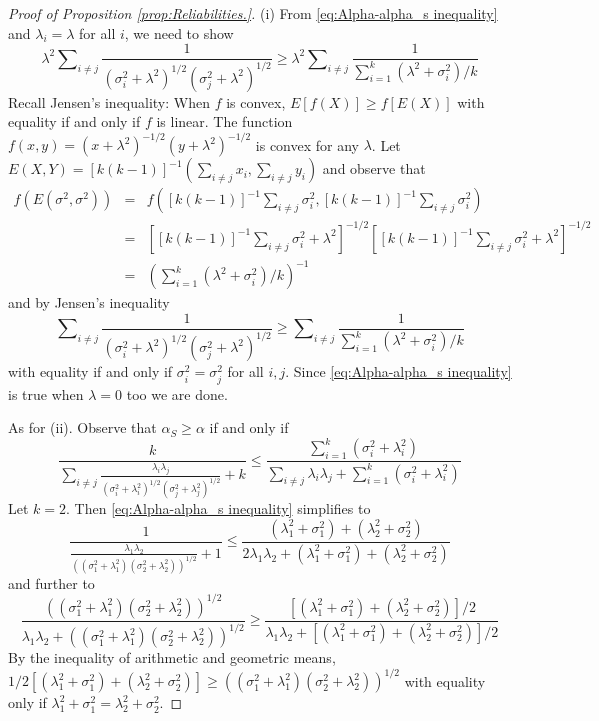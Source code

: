 \documentclass[twoside]{article}
\DeclareMathOperator{\tsum}{\textstyle \sum}
\renewcommand{\sqrt}[1]{{(#1)^{1/2}}}
\begin{document}
\begin{proof}[Proof of Proposition \ref{prop:Reliabilities.}]\label{proof:Reliabilities.}
(i) From \eqref{eq:Alpha-alpha_s inequality} and $\lambda_{i}=\lambda$
for all $i$, we need to show
\[
\lambda^{2}\tsum_{i\neq j}\frac{1}{\sqrt{\sigma_{i}^{2}+\lambda^{2}}\sqrt{\sigma_{j}^{2}+\lambda^{2}}}\geq\lambda^{2}\tsum_{i\neq j}\frac{1}{\tsum_{i=1}^{k}(\lambda^{2}+\sigma_{i}^{2})/k}
\]
Recall Jensen's inequality: When $f$ is convex, $E[f(X)]\geq f[E(X)]$ with equality if and only if $f$ is linear.
The function $f(x,y)=(x+\lambda^{2})^{-1/2}(y+\lambda^{2})^{-1/2}$
is convex for any $\lambda$. Let $E(X,Y)=[k(k-1)]^{-1}(\tsum_{i\neq j}x_{i},\tsum_{i\neq j}y_{i})$
and observe that
\begin{eqnarray*}
f(E(\sigma^{2},\sigma^{2})) & = & f([k(k-1)]^{-1}\tsum_{i\neq j}\sigma_{i}^{2},[k(k-1)]^{-1}\tsum_{i\neq j}\sigma_{i}^{2})\\
 & = & [[k(k-1)]^{-1}\tsum_{i\neq j}\sigma_{i}^{2}+\lambda^{2}]^{-1/2}[[k(k-1)]^{-1}\tsum_{i\neq j}\sigma_{i}^{2}+\lambda^{2}]^{-1/2}\\
 & = & (\tsum_{i=1}^{k}(\lambda^{2}+\sigma_{i}^{2})/k)^{-1}
\end{eqnarray*}
and by Jensen's inequality
\[
\tsum_{i\neq j}\frac{1}{\sqrt{\sigma_{i}^{2}+\lambda^{2}}\sqrt{\sigma_{j}^{2}+\lambda^{2}}}\geq\tsum_{i\neq j}\frac{1}{\tsum_{i=1}^{k}(\lambda^{2}+\sigma_{i}^{2})/k}
\]
with equality if and only if $\sigma_{i}^{2}=\sigma_{j}^{2}$ for
all $i,j$. Since \eqref{eq:Alpha-alpha_s inequality} is true when
$\lambda=0$ too we are done.

As for (ii). Observe that $\alpha_S\geq\alpha$
if and only if
\begin{equation}
\label{eq:Alpha-alpha_s inequality}
\frac{k}{\tsum_{i\neq j}\frac{\lambda_{i}\lambda_{j}}{\sqrt{\sigma_{i}^{2}+\lambda_{i}^{2}}\sqrt{\sigma_{j}^{2}+\lambda_{j}^{2}}}+k}\leq\frac{\tsum_{i=1}^{k}(\sigma_{i}^{2}+\lambda_{i}^{2})}{\tsum_{i\neq j}\lambda_{i}\lambda_{j}+\tsum_{i=1}^{k}(\sigma_{i}^{2}+\lambda_{i}^{2})}
\end{equation}
Let $k=2$. Then \eqref{eq:Alpha-alpha_s inequality} simplifies to
\[
\frac{1}{\frac{\lambda_{1}\lambda_{2}}{\sqrt{(\sigma_{1}^{2}+\lambda_{1}^{2})(\sigma_{2}^{2}+\lambda_{2}^{2})}}+1}\leq\frac{(\lambda_{1}^{2}+\sigma_{1}^{2})+(\lambda_{2}^{2}+\sigma_{2}^{2})}{2\lambda_{1}\lambda_{2}+(\lambda_{1}^{2}+\sigma_{1}^{2})+(\lambda_{2}^{2}+\sigma_{2}^{2})}
\]
and further to
\begin{equation*}
\frac{\sqrt{(\sigma_{1}^{2}+\lambda_{1}^{2})(\sigma_{2}^{2}+\lambda_{2}^{2})}}{\lambda_{1}\lambda_{2}+\sqrt{(\sigma_{1}^{2}+\lambda_{1}^{2})(\sigma_{2}^{2}+\lambda_{2}^{2})}} \geq \frac{[(\lambda_{1}^{2}+\sigma_{1}^{2})+(\lambda_{2}^{2}+\sigma_{2}^{2})]/2}{\lambda_{1}\lambda_{2}+[(\lambda_{1}^{2}+\sigma_{1}^{2})+(\lambda_{2}^{2}+\sigma_{2}^{2})]/2}
\end{equation*}
By the inequality of arithmetic and geometric means, $1/2[(\lambda_{1}^{2}+\sigma_{1}^{2})+(\lambda_{2}^{2}+\sigma_{2}^{2})]\geq\sqrt{(\sigma_{1}^{2}+\lambda_{1}^{2})(\sigma_{2}^{2}+\lambda_{2}^{2})}$
with equality only if $\lambda_{1}^{2}+\sigma_{1}^{2}=\lambda_{2}^{2}+\sigma_{2}^{2}$.


\end{proof}
\end{document}
